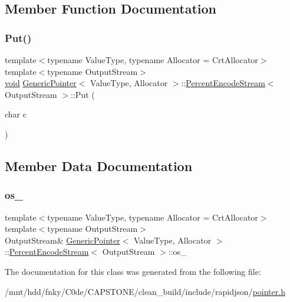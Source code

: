 \subsection{Member Function Documentation}
\mbox{\label{classGenericPointer_1_1PercentEncodeStream_ab932ed9ab00c9e0672755133fc8d8c11}} 
\subsubsection{\texorpdfstring{Put()}{Put()}}
{\footnotesize\ttfamily template$<$typename Value\+Type, typename Allocator = Crt\+Allocator$>$ \\
template$<$typename Output\+Stream$>$ \\
\hyperlink{imgui__impl__opengl3__loader_8h_ac668e7cffd9e2e9cfee428b9b2f34fa7}{void} \hyperlink{classGenericPointer}{Generic\+Pointer}$<$ Value\+Type, Allocator $>$\+::\hyperlink{classGenericPointer_1_1PercentEncodeStream}{Percent\+Encode\+Stream}$<$ Output\+Stream $>$\+::Put (\begin{DoxyParamCaption}\item[{char}]{c }\end{DoxyParamCaption})\hspace{0.3cm}{\ttfamily [inline]}}



\subsection{Member Data Documentation}
\mbox{\label{classGenericPointer_1_1PercentEncodeStream_a973de3c4a6b987a4fd301b8266d45d4a}} 
\subsubsection{\texorpdfstring{os\+\_\+}{os\_}}
{\footnotesize\ttfamily template$<$typename Value\+Type, typename Allocator = Crt\+Allocator$>$ \\
template$<$typename Output\+Stream$>$ \\
Output\+Stream\& \hyperlink{classGenericPointer}{Generic\+Pointer}$<$ Value\+Type, Allocator $>$\+::\hyperlink{classGenericPointer_1_1PercentEncodeStream}{Percent\+Encode\+Stream}$<$ Output\+Stream $>$\+::os\+\_\+\hspace{0.3cm}{\ttfamily [private]}}



The documentation for this class was generated from the following file\+:\begin{DoxyCompactItemize}
\item 
/mnt/hdd/fnky/\+C0de/\+C\+A\+P\+S\+T\+O\+N\+E/clean\+\_\+build/include/rapidjson/\hyperlink{pointer_8h}{pointer.\+h}\end{DoxyCompactItemize}
